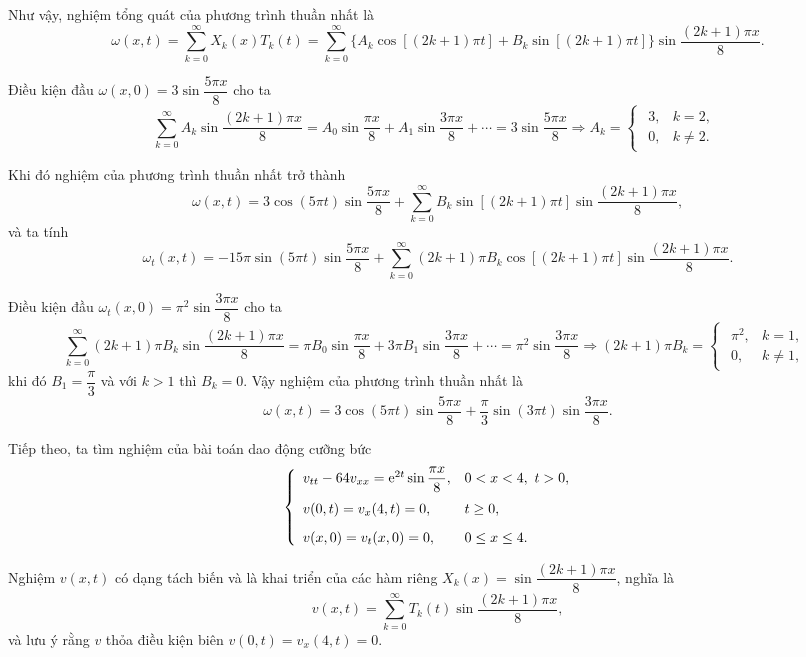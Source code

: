 \documentclass[10pt, a4paper]{article}
\begin{document}
	Như vậy, nghiệm tổng quát của phương trình thuần nhất là $$\omega(x,t)=\sum_{k=0}^\infty X_k(x)T_k(t)=\sum_{k=0}^\infty\big\{A_k\cos[(2k+1)\pi t]+B_k\sin[(2k+1)\pi t]\big\}\sin\frac{(2k+1)\pi x}{8}.$$
	
	Điều kiện đầu $\omega(x,0)=3\sin\dfrac{5\pi x}
	{8}$ cho ta $$\sum_{k=0}^\infty A_k\sin\frac{(2k+1)\pi x}{8}=A_0\sin\frac{\pi x}{8}+A_1\sin\frac{3\pi x}{8}+\cdots=3\sin\dfrac{5\pi x}
	{8}\Rightarrow A_k=\begin{cases}
		\begin{array}{ll}
			3, & k=2, \\
			0, & k\ne2.
		\end{array}
	\end{cases}$$
	
	Khi đó nghiệm của phương trình thuần nhất trở thành $$\omega(x,t)=3\cos(5\pi t)\sin\frac{5\pi x}{8}+\sum_{k=0}^\infty B_k\sin[(2k+1)\pi t]\sin\frac{(2k+1)\pi x}{8},$$
	và ta tính $$\omega_t(x,t)=-15\pi\sin(5\pi t)\sin\frac{5\pi x}{8}+\sum_{k=0}^\infty(2k+1)\pi B_k\cos[(2k+1)\pi t]\sin\frac{(2k+1)\pi x}{8}.$$
	
	Điều kiện đầu $\omega_t(x,0)=\pi^2\sin\dfrac{3\pi x}{8}$ cho ta $$\sum_{k=0}^\infty(2k+1)\pi B_k\sin\frac{(2k+1)\pi x}{8}=\pi B_0\sin\frac{\pi x}{8}+3\pi B_1\sin\frac{3\pi x}{8}+\cdots=\pi^2\sin\dfrac{3\pi x}{8}\Rightarrow(2k+1)\pi B_k=\begin{cases}
		\begin{array}{ll}
			\pi^2, & k=1, \\
			0, & k\ne1,
		\end{array}
	\end{cases}$$
	khi đó $B_1=\dfrac\pi3$ và với $k>1$ thì $B_k=0$. Vậy nghiệm của phương trình thuần nhất là $$\omega(x,t)=3\cos(5\pi t)\sin\frac{5\pi x}{8}+\frac\pi3\sin(3\pi t)\sin\frac{3\pi x}{8}.$$
	
	Tiếp theo, ta tìm nghiệm của bài toán dao động cưỡng bức $$\begin{cases}
		\begin{array}{ll}
			v_{tt}-64v_{xx}=\mathrm e^{2t}\sin\dfrac{\pi x}{8}, & 0<x<4,~t>0,\\
			\noalign{\vskip5pt}
			v(0,t)=v_x(4,t)=0, & t\ge0,\\
			\noalign{\vskip6pt}
			v(x,0)=v_t(x,0)=0, & 0\le x\le 4.
		\end{array}
	\end{cases}$$
	
	Nghiệm $v(x,t)$ có dạng tách biến và là khai triển của các hàm riêng $X_k(x)=\sin\dfrac{(2k+1)\pi x}{8}$, nghĩa là $$v(x,t)=\sum_{k=0}^\infty T_k(t)\sin\dfrac{(2k+1)\pi x}{8},$$
	và lưu ý rằng $v$ thỏa điều kiện biên $v(0,t)=v_x(4,t)=0$.\\
	
\end{document}
